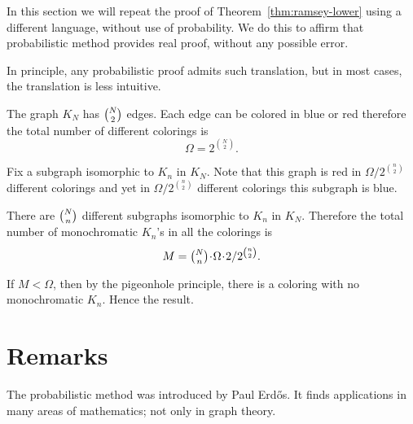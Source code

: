 In this section we will repeat the proof of Theorem~\ref{thm:ramsey-lower} using a different language, without use of probability.
We do this to affirm that probabilistic method provides real proof, without any possible error.

In principle,  any probabilistic proof admits such translation,
but in most cases, the translation is less intuitive. 

The graph $K_N$ has $\tbinom{N}{2}$ edges.
Each edge can be colored in blue or red therefore the total number of different colorings is \[\Omega=2^{\binom{N}{2}}.\]

Fix a subgraph isomorphic to $K_n$ in $K_N$.
Note that this graph is red in $\Omega/2^{\binom n2}$ different colorings
and yet in $\Omega/2^{\binom n2}$ different colorings this subgraph is blue.

There are $\tbinom Nn$ different subgraphs isomorphic to $K_n$ in $K_N$.
Therefore the total number of monochromatic $K_n$'s in all the colorings 
is 
\[M=\tbinom Nn\cdot\Omega\cdot  2/2^{\binom n2}.\]

If $M<\Omega$, then by the pigeonhole principle,
there is a coloring with no monochromatic $K_n$.
Hence the result.
\qeds

%

\section*{Remarks}

The probabilistic method was introduced by Paul Erd\H os.
It  finds applications in many areas of mathematics; not only in graph theory.

